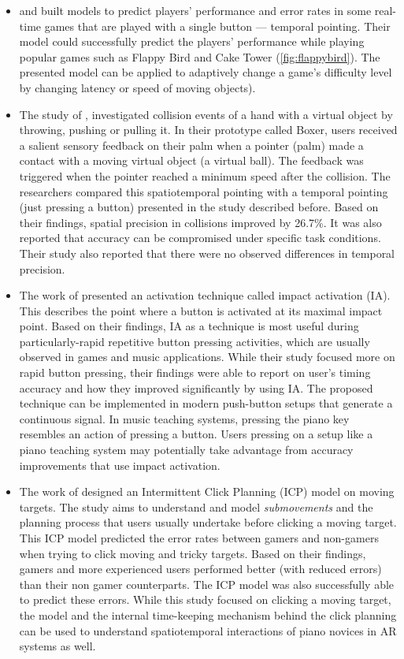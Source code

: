 \documentclass[manuscript,screen]{acmart}
\begin{document}
\begin{itemize}
\item \citet{lee2016modelling} and \citet{lee2018moving} built models to predict players’ performance and error rates in some real-time games that are played with a single button — temporal pointing. Their model could successfully predict the players’ performance while playing popular games such as Flappy Bird and Cake Tower (\ref{fig:flappybird}). The presented model can be applied to adaptively change a game’s difficulty level by changing latency or speed of moving objects). 
\item The study of \citet{lee2017boxer}, investigated collision events of a hand with a virtual object by throwing, pushing or pulling it. In their prototype called Boxer, users received a salient sensory feedback on their palm when a pointer (palm) made a contact with a moving virtual object (a virtual ball). The feedback was triggered when the pointer reached a minimum speed after the collision. The researchers compared this spatiotemporal pointing with a temporal pointing (just pressing a button) presented in the study described before. Based on their findings, spatial precision in collisions improved by 26.7\%. It was also reported that accuracy can be compromised under specific task conditions. Their study also reported that there were no observed differences in temporal precision.
\item The work of \citet{kim2018impact} presented an activation technique called impact activation (IA). This describes the point where a button is activated at its maximal impact point. Based on their findings, IA as a technique is most useful during particularly-rapid repetitive button pressing activities, which are usually observed in games and music applications. While their study focused more on rapid button pressing, their findings were able to report on user’s timing accuracy and how they improved significantly by using IA. The proposed technique can be implemented in modern push-button setups that generate a continuous signal. In music teaching systems, pressing the piano key resembles an action of pressing a button. Users pressing on a setup like a piano teaching system may potentially take advantage from accuracy improvements that use impact activation.
\item The work of \citet{park2020intermittent} designed an Intermittent Click Planning (ICP) model on moving targets. The study aims to understand and model \textit{submovements} and the planning process that users usually undertake before clicking a moving target. This ICP model predicted the error rates between gamers and non-gamers when trying to click moving and tricky targets. Based on their findings, gamers and more experienced users performed better (with reduced errors) than their non gamer counterparts. The ICP model was also successfully able to predict these errors. While this study focused on clicking a moving target, the model and the internal time-keeping mechanism behind the click planning can be used to understand spatiotemporal interactions of piano novices in AR systems as well. 
\end{itemize}
\end{document}
